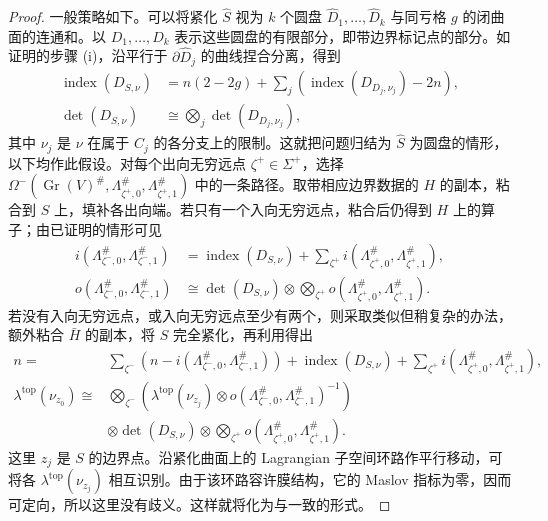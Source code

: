 \begin{proof}
一般策略如下。可以将紧化 $\hat S$ 视为 $k$ 个圆盘 $\hat D_1,\allowbreak \ldots,\allowbreak \hat D_k$ 与同亏格 $g$ 的闭曲面的连通和。以 $D_1,\allowbreak \ldots,\allowbreak D_k$ 表示这些圆盘的有限部分，即带边界标记点的部分。如证明的步骤 (i)，沿平行于 $\partial\hat D_j$ 的曲线捏合分离，得到
\[
\begin{aligned}
\operatorname{index}(D_{S,\nu})&=n(2-2g)+\sum_j(\operatorname{index}(D_{D_j,\nu_j})-2n),\\
\det(D_{S,\nu})&\cong\bigotimes_j\det(D_{D_j,\nu_j}),
\end{aligned}
\]
其中 $\nu_j$ 是 $\nu$ 在属于 $\hat C_j$ 的各分支上的限制。这就把问题归结为 $\hat S$ 为圆盘的情形，以下均作此假设。对每个出向无穷远点 $\zeta^+\in\Sigma^+$，选择 $\Omega^-(\operatorname{Gr}(V)^\#,\allowbreak \Lambda_{\zeta^+,\allowbreak 0}^\#,\allowbreak \Lambda_{\zeta^+,\allowbreak 1}^\#)$ 中的一条路径。取带相应边界数据的 $H$ 的副本，粘合到 $S$ 上，填补各出向端。若只有一个入向无穷远点，粘合后仍得到 $H$ 上的算子；由已证明的情形可见
\[
\begin{aligned}
i(\Lambda_{\zeta^-,0}^\#,\Lambda_{\zeta^-,1}^\#)&=\operatorname{index}(D_{S,\nu})+\sum_{\zeta^+}i(\Lambda_{\zeta^+,0}^\#,\Lambda_{\zeta^+,1}^\#),\\
o(\Lambda_{\zeta^-,0}^\#,\Lambda_{\zeta^-,1}^\#)&\cong\det(D_{S,\nu})\otimes\bigotimes_{\zeta^+}o(\Lambda_{\zeta^+,0}^\#,\Lambda_{\zeta^+,1}^\#).
\end{aligned}
\]
若没有入向无穷远点，或入向无穷远点至少有两个，则采取类似但稍复杂的办法，额外粘合 $\bar H$ 的副本，将
$S$ 完全紧化，再利用得出
\begin{equation}\label{eq:11.28}
\begin{aligned}
n={}&\sum_{\zeta^-}(n-i(\Lambda_{\zeta^-,0}^\#,\Lambda_{\zeta^-,1}^\#))
+\operatorname{index}(D_{S,\nu})+\sum_{\zeta^+}i(\Lambda_{\zeta^+,0}^\#,\Lambda_{\zeta^+,1}^\#),\\
\lambda^{\mathrm{top}}(\nu_{z_0})\cong{}&\bigotimes_{\zeta^-}\left(\lambda^{\mathrm{top}}(\nu_{z_j})\otimes o(\Lambda_{\zeta^-,0}^\#,\Lambda_{\zeta^-,1}^\#)^{-1}\right)\\
&\otimes\det(D_{S,\nu})\otimes\bigotimes_{\zeta^+}o(\Lambda_{\zeta^+,0}^\#,\Lambda_{\zeta^+,1}^\#).
\end{aligned}
\end{equation}
这里 $z_j$ 是 $S$ 的边界点。沿紧化曲面上的 Lagrangian 子空间环路作平行移动，可将各 $\lambda^{\mathrm{top}}(\nu_{z_j})$ 相互识别。由于该环路容许膜结构，它的 Maslov 指标为零，因而可定向，所以这里没有歧义。这样就将化为与一致的形式。

\end{proof}
